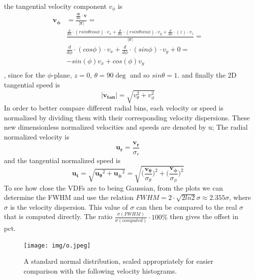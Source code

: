 the tangential velocity component $ v_{\phi}$ is
\begin{equation}
\begin{aligned}
\boldsymbol{v_{\phi}} &= 
\frac{\frac{d\boldsymbol{r}}{d\phi} \cdot \boldsymbol{v}}{|\boldsymbol{r}|} = \\
& \frac{\frac{d}{d\phi} \cdot (r sin\theta cos\phi)\cdot v_x + 
\frac{d}{d\phi} \cdot (r sin\theta sin\phi)\cdot v_y + 
\frac{d}{d\phi} \cdot (z)\cdot v_z}{|\boldsymbol{r}|} = \\
& \frac{d}{d\phi} \cdot (cos\phi) \cdot v_x + 
\frac{d}{d\phi} \cdot (sin\phi)\cdot v_y + 0 = \\
& -sin(\phi)v_x + cos(\phi)v_y  \\
\end{aligned}
\end{equation},
since for the $\phi$-plane, $z = 0$, $\theta = 90 \deg $ and so $ sin\theta = 1$.
and finally the 2D tangential speed is
\begin{equation}
|\boldsymbol{v_{tan}}| = \sqrt{v_{\theta}^2+v_{\phi}^2}  
\end{equation}
In order to better compare different radial bins, each velocity or speed is normalized by dividing them with their corresponding velocity dispersions. These new dimensionless normalized velocities and speeds are denoted by u;
The radial normalized velocity is 
\begin{equation}
\boldsymbol{u_r} = \frac{\boldsymbol{v_r}}{\sigma_r}
\end{equation}
and the tangential normalized speed is 
\begin{equation}
\boldsymbol{u_t} = \sqrt{\boldsymbol{u_{\theta}}^2+\boldsymbol{u_{\phi}}^2}  =      
\sqrt{\bigg(\frac{\boldsymbol{v_{\theta}}}{\sigma_{\theta}} \bigg)^2+\bigg(\frac{\boldsymbol{v_{\phi}}}{\sigma_{\phi}} \bigg)^2} 
\end{equation}
To see how close the VDFs are to being Gaussian, from the plots we can determine the FWHM and use the relation $ FWHM = 2 \cdot \sqrt{2 ln 2} \sigma \approx 2.355 \sigma $, where $\sigma$ is the velocity dispersion.
This value of $\sigma$ can then be compared to the real $\sigma$ that is computed directly.
The ratio $ \frac{\sigma(FWHM)}{\sigma(computed)} \cdot 100 \% $ then gives the offset in pct.

\begin{figure}
\centering
\texttt{[image: img/o.jpeg]}
\caption{A standard normal distribution, scaled appropriately for easier comparison with the following velocity histograms.}
\label{fig:test}
\end{figure}

